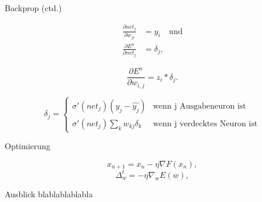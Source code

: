 \documentclass[10pt, compress, xetex]{beamer}
\begin{document}
\begin{frame}{Backprop (ctd.)}


\begin{align}
\frac{\partial net_j }{\partial w_{ji}} & =  y_i \quad \text{und}
\\
\frac{\partial E^n}{\partial net_j} & =  \delta_j,
\end{align}

\begin{equation}
\label{eq:evaluate}
  \frac{\partial E^n}{\partial w_{i,j}} = z_i * \delta_j.
\end{equation}

\begin{equation}
\label{eq:backpropagation}
\delta_j =  \begin{cases}
               \sigma ' (net_j) (y_j - \hat{y_j})           & \text{wenn j Ausgabeneuron ist}\\
               \sigma ' (net_j) \sum_k w_{kj} \delta_k     & \text{wenn j verdecktes Neuron ist}
           \end{cases} 
\end{equation} 
\end{frame}
\begin{frame}{Optimierung}

\begin{equation}
x_{n+1}=x_n- \eta  \nabla F(x_n), 
\end{equation}
\begin{equation}
  \Delta_w^t = - \eta  \nabla_w E(w),
\end{equation}

\end{frame}

\begin{frame}{Ausblick}
	blablablablabla
\end{frame}
\end{document}
